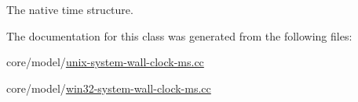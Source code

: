The native time structure. 



The documentation for this class was generated from the following files\+:\begin{DoxyCompactItemize}
\item 
core/model/\hyperlink{unix-system-wall-clock-ms_8cc}{unix-\/system-\/wall-\/clock-\/ms.\+cc}\item 
core/model/\hyperlink{win32-system-wall-clock-ms_8cc}{win32-\/system-\/wall-\/clock-\/ms.\+cc}\end{DoxyCompactItemize}
